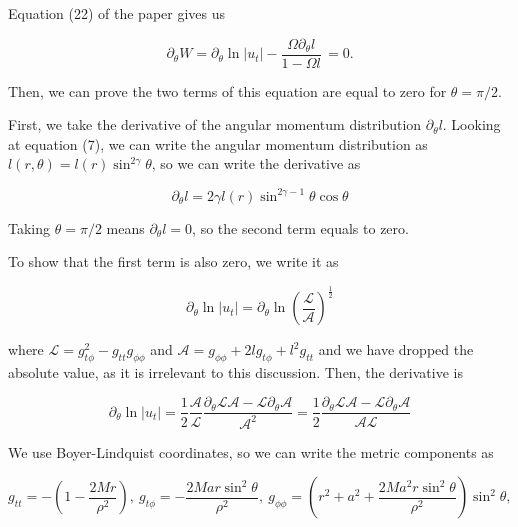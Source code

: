 \documentclass{article}
\begin{document}
Equation (22) of the paper gives us

\begin{equation}
\partial_{\theta} W = \partial_{\theta} \ln|u_t| - \frac{\Omega \partial_{\theta}l}{1 - \Omega l}\, = 0.
\end{equation}

Then, we can prove the two terms of this equation are equal to zero for $\theta = \pi/2$.

First, we take the derivative of the angular momentum distribution $\partial_{\theta} l$. Looking at equation (7), we can write the angular momentum distribution as $l(r, \theta) = l(r) \sin^{2\gamma} \theta$, so we can write the derivative as

\begin{equation}
\partial_{\theta} l = 2\gamma l(r) \sin^{2\gamma - 1} \theta \cos \theta
\end{equation}

Taking $\theta = \pi/2$ means $\partial_{\theta} l = 0$, so the second term equals to zero.

To show that the first term is also zero, we write it as

\begin{equation}
\partial_{\theta} \ln|u_t| = \partial_{\theta} \ln \left(\frac{\mathcal{L}}{\mathcal{A}}\right)^{\frac{1}{2}}
\end{equation}

where $\mathcal{L} = g_{t \phi}^2 - g_{tt} g_{\phi\phi}$ and $\mathcal{A} = g_{\phi\phi} + 2 l g_{t\phi} + l^2g_{tt}$ and we have dropped the absolute value, as it is irrelevant to this discussion. Then, the derivative is

\begin{equation}
\partial_{\theta} \ln|u_t| = \frac{1}{2} \frac{\mathcal{A}}{\mathcal{L}}\frac{\partial_{\theta}{\mathcal{L}}\mathcal{A} - \mathcal{L}\partial_{\theta}\mathcal{A}}{\mathcal{A}^2} = \frac{1}{2} \frac{\partial_{\theta}{\mathcal{L}}\mathcal{A} - \mathcal{L}\partial_{\theta}\mathcal{A}}{\mathcal{A} \mathcal{L}}
\end{equation}

We use Boyer-Lindquist coordinates, so we can write the metric components as

\begin{equation}
g_{tt} = - \left(1 - \frac{2Mr}{\rho^2}\right), \ g_{t\phi} = -\frac{2Mar\sin^2\theta}{\rho^2}, \ g_{\phi\phi} = \left(r^2 + a^2 + \frac{2Ma^2r\sin^2\theta}{\rho^2}\right) \sin^2 \theta,
\end{equation}
\end{document}
